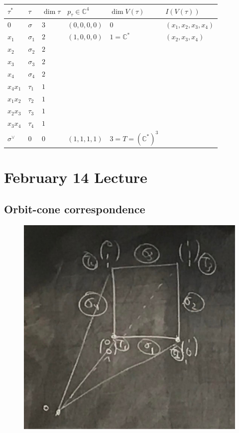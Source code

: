 \documentclass[a4paper,12pt]{amsart}
\newcommand{\CC}{\mathbb{C}}
\begin{document}
\begin{Eg}
\begin{center}
\begin{tabular}{|l|l|l|l|l|l|}
\hline
\textbf{$\tau ^*$} & \textbf{$\tau$} & \textbf{$\dim \tau$} & \textbf{$p_\tau \in \CC^4$} & \textbf{$\dim V(\tau)$} & \textbf{$I(V(\tau))$} \\ \hline
$0$ & $\sigma$  & $3$ &  $(0,0,0,0)$ & $0$ & $(x_1, x_2, x_3, x_4)$ \\ \hline
$x_1$ & $\sigma_1$  & $2$ & $(1,0,0,0)$   & $1 = \CC^*$  & $(x_2, x_3, x_4)$  \\ \hline
$x_2$ & $\sigma_2$ &  $2$ & &  &  \\ \hline
$x_3$ & $\sigma_3$ &  $2$ & &  &  \\ \hline
$x_4$ & $\sigma_4$ &  $2$ & &  &  \\ \hline
$x_4 x_1$ & $\tau_1$  & $1$ &  &  &  \\ \hline
$x_1 x_2$ & $\tau_2$ & $1$ &  &  &  \\ \hline
$x_2 x_3$ & $\tau_3$ & $1$ &  &  &  \\ \hline
$x_3 x_4$ & $\tau_4$ & $1$  &  &  &  \\ \hline
$\sigma^\vee$ & $0$  & $0$ & $(1,1,1,1)$  & $3 = T = (\CC^*)^3$  &  \\ \hline
\end{tabular}
\end{center}
\end{Eg}

\newpage
\section{February 14 Lecture}
\subsection{Orbit-cone correspondence}
\begin{figure}[h]
	\centering
	\includegraphics[scale=0.14]{pic/3}
\end{figure}
\end{document}
